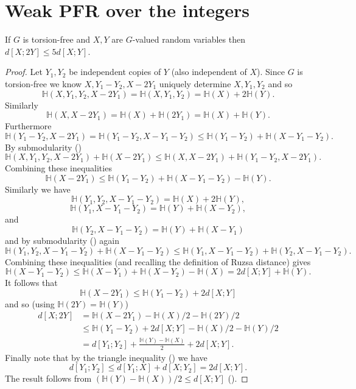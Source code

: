 \chapter{Weak PFR over the integers}

\begin{lemma}\label{torsion-free-doubling}\leanok
If $G$ is torsion-free and $X,Y$ are $G$-valued random variables then $d[X;2Y]\leq 5d[X;Y]$.
\end{lemma}
\begin{proof}
\leanok
Let $Y_1,Y_2$ be independent copies of $Y$ (also independent of $X$). Since $G$ is torsion-free we know $X,Y_1-Y_2,X-2Y_1$ uniquely determine $X,Y_1,Y_2$ and so
\[\mathbb{H}(X,Y_1,Y_2,X-2Y_1)=\mathbb{H}(X,Y_1,Y_2)=\mathbb{H}(X)+2\mathbb{H}(Y).\]
Similarly
\[\mathbb{H}(X,X-2Y_1)=\mathbb{H}(X)+\mathbb{H}(2Y_1)=\mathbb{H}(X)+\mathbb{H}(Y).\]
Furthermore
\[\mathbb{H}(Y_1-Y_2,X-2Y_1)=\mathbb{H}(Y_1-Y_2,X-Y_1-Y_2)\leq \mathbb{H}(Y_1-Y_2)+\mathbb{H}(X-Y_1-Y_2).\]
By submodularity ()
\[\mathbb{H}(X,Y_1,Y_2,X-2Y_1)+\mathbb{H}(X-2Y_1)\leq \mathbb{H}(X,X-2Y_1)+\mathbb{H}(Y_1-Y_2,X-2Y_1).\]
Combining these inequalities
\[\mathbb{H}(X-2Y_1)\leq \mathbb{H}(Y_1-Y_2)+\mathbb{H}(X-Y_1-Y_2)-\mathbb{H}(Y).\]
Similarly we have
\[\mathbb{H}(Y_1,Y_2,X-Y_1-Y_2)=\mathbb{H}(X)+2\mathbb{H}(Y),\]
\[\mathbb{H}(Y_1,X-Y_1-Y_2)=\mathbb{H}(Y)+\mathbb{H}(X-Y_2),\]
and
\[\mathbb{H}(Y_2,X-Y_1-Y_2)=\mathbb{H}(Y)+\mathbb{H}(X-Y_1)\]
and by submodularity () again
\[\mathbb{H}(Y_1,Y_2,X-Y_1-Y_2)+ \mathbb{H}(X-Y_1-Y_2)\leq \mathbb{H}(Y_1,X-Y_1-Y_2)+\mathbb{H}(Y_2,X-Y_1-Y_2).\]
Combining these inequalities (and recalling the definition of Ruzsa distance) gives
\[\mathbb{H}(X-Y_1-Y_2)\leq \mathbb{H}(X-Y_1)+\mathbb{H}(X-Y_2)-\mathbb{H}(X)=2d[X;Y]+\mathbb{H}(Y).\]
It follows that
\[\mathbb{H}(X-2Y_1)\leq \mathbb{H}(Y_1-Y_2)+2d[X;Y]\]
and so (using $\mathbb{H}(2Y)=\mathbb{H}(Y)$)
\begin{align*}
d[X;2Y]
&=\mathbb{H}(X-2Y_1)-\mathbb{H}(X)/2-\mathbb{H}(2Y)/2\\
&\leq \mathbb{H}(Y_1-Y_2)+2d[X;Y]-\mathbb{H}(X)/2-\mathbb{H}(Y)/2\\
&= d[Y_1;Y_2]+\frac{\mathbb{H}(Y)-\mathbb{H}(X)}{2}+2d[X;Y].
\end{align*}
Finally note that by the triangle inequality () we have
\[d[Y_1;Y_2]\leq d[Y_1;X]+d[X;Y_2]=2d[X;Y].\]
The result follows from $(\mathbb{H}(Y)-\mathbb{H}(X))/2\leq d[X;Y]$ ().
\end{proof}

